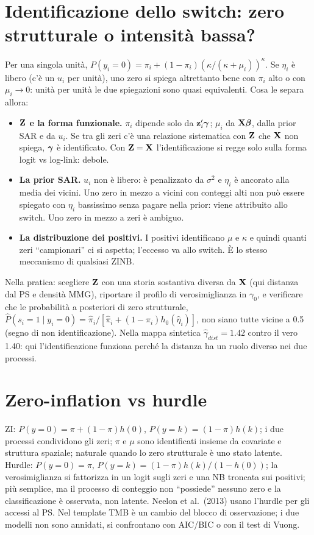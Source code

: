 \documentclass[11pt,a4paper]{article}
\begin{document}
\section{Identificazione dello switch: zero strutturale o intensità bassa?}\label{app:zident}
Per una singola unità, $P(y_i=0)=\pi_i+(1-\pi_i)(\kappa/(\kappa+\mu_i))^\kappa$. Se $\eta_i$ è libero (c'è un $u_i$ per unità), uno zero si spiega altrettanto bene con $\pi_i$ alto o con $\mu_i\to0$: unità per unità le due spiegazioni sono quasi equivalenti. Cosa le separa allora:
\begin{itemize}[nosep]
\item \textbf{$\mathbf{Z}$ e la forma funzionale.} $\pi_i$ dipende solo da $\mathbf z_i'\boldsymbol{\gamma}$; $\mu_i$ da $\mathbf{X}\boldsymbol{\beta}$, dalla prior SAR e da $u_i$. Se tra gli zeri c'è una relazione sistematica con $\mathbf{Z}$ che $\mathbf{X}$ non spiega, $\boldsymbol{\gamma}$ è identificato. Con $\mathbf{Z}=\mathbf{X}$ l'identificazione si regge solo sulla forma logit vs log-link: debole.
\item \textbf{La prior SAR.} $u_i$ non è libero: è penalizzato da $\sigma^2$ e $\eta_i$ è ancorato alla media dei vicini. Uno zero in mezzo a vicini con conteggi alti non può essere spiegato con $\eta_i$ bassissimo senza pagare nella prior: viene attribuito allo switch. Uno zero in mezzo a zeri è ambiguo.
\item \textbf{La distribuzione dei positivi.} I positivi identificano $\mu$ e $\kappa$ e quindi quanti zeri ``campionari'' ci si aspetta; l'eccesso va allo switch. È lo stesso meccanismo di qualsiasi ZINB.
\end{itemize}
Nella pratica: scegliere $\mathbf{Z}$ con una storia sostantiva diversa da $\mathbf{X}$ (qui distanza dal PS e densità MMG), riportare il profilo di verosimiglianza in $\gamma_0$, e verificare che le probabilità a posteriori di zero strutturale, $\hat P(s_i=1\mid y_i=0)=\hat\pi_i/[\hat\pi_i+(1-\hat\pi_i)h_0(\hat\eta_i)]$, non siano tutte vicine a 0.5 (segno di non identificazione). Nella mappa sintetica $\hat\gamma_{dist}=1.42$ contro il vero 1.40: qui l'identificazione funziona perché la distanza ha un ruolo diverso nei due processi.

\section{Zero-inflation vs hurdle}\label{app:zeros}
ZI: $P(y=0)=\pi+(1-\pi)h(0)$, $P(y=k)=(1-\pi)h(k)$; i due processi condividono gli zeri; $\pi$ e $\mu$ sono identificati insieme da covariate e struttura spaziale; naturale quando lo zero strutturale è uno stato latente. Hurdle: $P(y=0)=\pi$, $P(y=k)=(1-\pi)h(k)/(1-h(0))$; la verosimiglianza si fattorizza in un logit sugli zeri e una NB troncata sui positivi; più semplice, ma il processo di conteggio non ``possiede'' nessuno zero e la classificazione è osservata, non latente. Neelon et al.\ (2013) usano l'hurdle per gli accessi al PS. Nel template TMB è un cambio del blocco di osservazione; i due modelli non sono annidati, si confrontano con AIC/BIC o con il test di Vuong.
\end{document}
